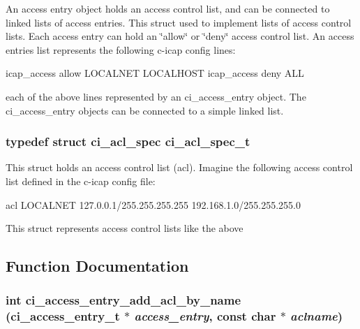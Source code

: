 An access entry object holds an access control list, and can be connected to linked lists of access entries. This struct used to implement lists of access control lists. Each access entry can hold an \char`\"{}allow\char`\"{} or \char`\"{}deny\char`\"{} access control list. An access entries list represents the following c-\/icap config lines: 
\begin{DoxyCode}
  icap_access allow LOCALNET LOCALHOST
  icap_access deny ALL
\end{DoxyCode}
 each of the above lines represented by an ci\_\-access\_\-entry object. The ci\_\-access\_\-entry objects can be connected to a simple linked list. \hypertarget{group__ACL_ga2f65107a03de82fff4ae2e1340195a7f}{
\subsubsection[{ci\_\-acl\_\-spec\_\-t}]{\setlength{\rightskip}{0pt plus 5cm}typedef struct ci\_\-acl\_\-spec {\bf ci\_\-acl\_\-spec\_\-t}}}
\label{group__ACL_ga2f65107a03de82fff4ae2e1340195a7f}


This struct holds an access control list (acl). Imagine the following access control list defined in the c-\/icap config file:\par
 
\begin{DoxyCode}
 acl LOCALNET 127.0.0.1/255.255.255.255 192.168.1.0/255.255.255.0
\end{DoxyCode}
 This struct represents access control lists like the above 

\subsection{Function Documentation}
\hypertarget{group__ACL_ga9ed5d0d0d59486ddb28453c9fcda9fc9}{
\subsubsection[{ci\_\-access\_\-entry\_\-add\_\-acl\_\-by\_\-name}]{\setlength{\rightskip}{0pt plus 5cm}int ci\_\-access\_\-entry\_\-add\_\-acl\_\-by\_\-name ({\bf ci\_\-access\_\-entry\_\-t} $\ast$ {\em access\_\-entry}, \/  const char $\ast$ {\em aclname})}}
\label{group__ACL_ga9ed5d0d0d59486ddb28453c9fcda9fc9}


